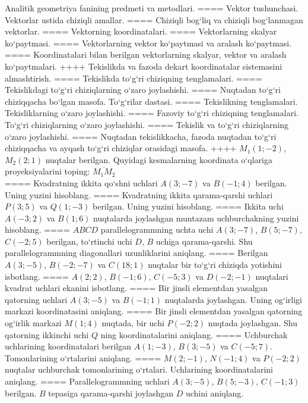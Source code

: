 Analitik geometriya fanining predmeti va metodlari.
====
Vektor tushunchasi. Vektorlar ustida chiziqli amallar.
====
Chiziqli bog‘liq va chiziqli bog‘lanmagan vektorlar.
====
Vektorning koordinatalari.
====
Vektorlarning skalyar ko‘paytmasi.
====
Vektorlarning vektor ko‘paytmasi va aralash ko‘paytmasi.
====
Koordinatalari bilan berilgan vektorlarning skalyar, vektor va aralash ko‘paytmalari.
++++
Tekislikda va fazoda dekart koordinatalar sistemasini almashtirish.
====
Tekislikda to‘g‘ri chiziqning tenglamalari.
====
Tekislikdagi to‘g‘ri chiziqlarning o‘zaro joylashishi.
====
Nuqtadan to‘g‘ri chiziqqacha bo‘lgan masofa. To‘g‘rilar dastasi.
====
Tekislikning tenglamalari. Tekisliklarning o‘zaro joylashishi.
====
Fazoviy to‘g‘ri chiziqning tenglamalari. To‘g‘ri chiziqlarning o‘zaro joylashishi.
====
Tekislik va to‘g‘ri chiziqlarning o‘zaro joylashishi.
====
Nuqtadan tekislikkacha, fazoda nuqtadan to‘g‘ri chiziqqacha va ayqash to‘g‘ri chiziqlar orasidagi masofa.
++++
$M_1 (1; -2) $, $M_2 (2; 1) $ nuqtalar berilgan.
Quyidagi kesmalarning koordinata o‘qlariga proyeksiyalarini toping: $\overline{M_1M_2}$ \\
====
Kvadratning ikkita qo‘shni uchlari $A (3; -7)$ va
$B (-1;4) $ berilgan. Uning yuzini hisoblang.
====
Kvadratning ikkita qarama-qarshi uchlari $P (3; 5) $ va
$Q (1; -3) $ berilgan. Uning yuzini hisoblang.
====
Ikkita uchi $A (-3; 2) $ va $B (1; 6) $ nuqtalarda
joylashgan muntazam uchburchakning yuzini hisoblang.
====
$ABCD$ parallelogrammning uchta uchi $A (3; -7) $,
$B (5; -7) $, $C (-2; 5) $ berilgan, to‘rtinchi uchi $D$,
$B$ uchiga qarama-qarshi. Shu parallelogrammning diagonallari
uzunliklarini aniqlang.
====
Berilgan $A (3; -5) $, $B (-2; -7)$ va
$C (18; 1) $ nuqtalar bir to‘g‘ri chiziqda yotishini isbotlang.
====
$A (2;2) $, $B (-1;6) $, $C (-5;3) $ va $D (-2;-1) $
nuqtalari kvadrat uchlari ekanini isbotlang.
====
Bir jinsli elementdan yasalgan qatorning uchlari
$A (3;-5) $ va $B (-1;1) $ nuqtalarda joylashgan. Uning og‘irligi
markazi koordinatasini aniqlang.
====
Bir jinsli elementdan yasalgan qatorning og‘irlik markazi
$M (1;4) $ nuqtada, bir uchi $P (-2;2) $ nuqtada joylashgan. Shu
qatorning ikkinchi uchi $Q$ ning koordinatalarini aniqlang.
====
Uchburchak uchlarining koordinatalari berilgan
$A (1;-3) $, $B (3;-5) $ va $C (-5;7) $. Tomonlarining o‘rtalarini
aniqlang.
====
$M (2;-1) $, $N (-1;4) $ va $P (-2;2) $ nuqtalar
uchburchak tomonlarining o‘rtalari. Uchlarining koordinatalarini
aniqlang.
====
Parallelogrammning uchlari
$A (3;-5) $, $B (5;-3) $, $C (-1;3) $ berilgan. $B$ tepasiga
qarama-qarshi joylashgan $D$ uchini aniqlang.
